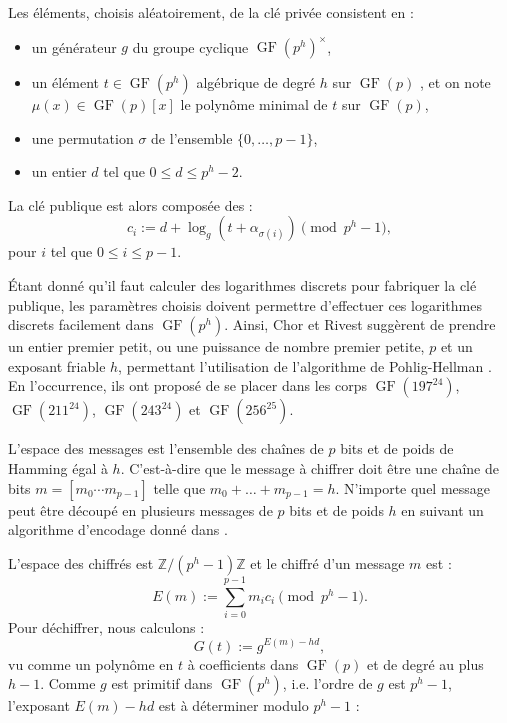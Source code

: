 \documentclass[a4paper, titlepage, 11pt]{article}
\theoremstyle{definition}
\theoremstyle{remark}
\def\Z{\mathbb Z}
\def\gf{\operatorname{GF}}
\begin{document}
Les éléments, choisis aléatoirement, de la clé privée consistent en :
\begin{itemize}
\item un générateur $g$ du groupe cyclique $\gf(p^h)^\times$,
\item un élément $t \in \gf(p^h)$ algébrique de degré $h$ sur $\gf(p)$ , et on note $\mu(x) \in \gf(p)[x]$ le polynôme minimal de $t$ sur $\gf(p)$,
\item une permutation $\sigma$ de l'ensemble $\{0, \dots, p-1\}$,
\item un entier $d$ tel que $0 \leqslant d \leqslant p^h-2$.
\end{itemize}
La clé publique est alors composée des :
$$c_i := d + \log_g\left(t + \alpha_{\sigma(i)}\right) \pmod{p^h-1},$$
pour $i$ tel que $0 \leqslant i \leqslant p-1$. 

\'Etant donné qu'il faut calculer des logarithmes discrets pour fabriquer la clé publique, les paramètres choisis doivent permettre d'effectuer ces logarithmes discrets facilement dans $\gf(p^h)$. Ainsi, Chor et Rivest suggèrent de prendre un entier premier petit, ou une puissance de nombre premier petite, $p$ et un exposant friable $h$, permettant l'utilisation de l'algorithme de Pohlig-Hellman \cite{pohligHellman1978}. En l’occurrence, ils ont proposé de se placer dans les corps $\gf(197^{24})$, $\gf(211^{24})$, $\gf(243^{24})$ et $\gf(256^{25})$.

L'espace des messages est l'ensemble des chaînes de $p$ bits et de poids de Hamming égal à $h$. C'est-à-dire que le message à chiffrer doit être une chaîne de bits $m = [m_0\cdots m_{p-1}]$ telle que $m_0+\dots + m_{p-1} = h$. N'importe quel message peut être découpé en plusieurs messages de $p$ bits et de poids $h$ en suivant un algorithme d'encodage donné dans \cite[IV.B.]{chorRivest1988}.

L'espace des chiffrés est $\Z/(p^h-1)\Z$ et le chiffré d'un message $m$ est :
$$E(m) := \sum_{i=0}^{p-1} m_ic_i \pmod{p^h-1}.$$
Pour déchiffrer, nous calculons :
$$G(t) := g^{E(m) - hd},$$
vu comme un polynôme en $t$ à coefficients dans $\gf(p)$ et de degré au plus $h-1$. Comme $g$ est primitif dans $\gf(p^h)$, i.e. l'ordre de $g$ est $p^h-1$, l'exposant $E(m) - hd$ est à déterminer modulo $p^h-1$ :
\end{document}
